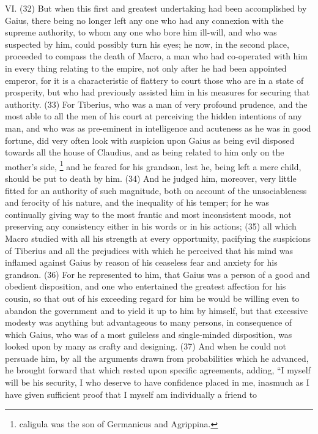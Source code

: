 VI. (32) But when this first and greatest undertaking had been accomplished by Gaius, there being
no longer left any one who had any connexion with the supreme authority, to whom any one who
bore him ill-will, and who was suspected by him, could possibly turn his eyes; he now, in the second
place, proceeded to compass the death of Macro, a man who had co-operated with him in every
thing relating to the empire, not only after he had been appointed emperor, for it is a characteristic
of flattery to court those who are in a state of prosperity, but who had previously assisted him in his
measures for securing that authority. (33) For Tiberius, who was a man of very profound
prudence, and the most able to all the men of his court at perceiving the hidden intentions of any
man, and who was as pre-eminent in intelligence and acuteness as he was in good fortune, did
very often look with suspicion upon Gaius as being evil disposed towards all the house of Claudius,
and as being related to him only on the mother's side, \footnote{caligula was the son of Germanicus and Agrippina.}
and he feared for his grandson, lest he, being left a mere child, should be put to death by him. (34)
And he judged him, moreover, very little fitted for an authority of such magnitude, both on account
of the unsociableness and ferocity of his nature, and the inequality of his temper; for he was
continually giving way to the most frantic and most inconsistent moods, not preserving any
consistency either in his words or in his actions; (35) all which Macro studied with all his strength at
every opportunity, pacifying the suspicions of Tiberius and all the prejudices with which he
perceived that his mind was inflamed against Gaius by reason of his ceaseless fear and anxiety
for his grandson. (36) For he represented to him, that Gaius was a person of a good and obedient
disposition, and one who entertained the greatest affection for his cousin, so that out of his
exceeding regard for him he would be willing even to abandon the government and to yield it up to
him by himself, but that excessive modesty was anything but advantageous to many persons, in
consequence of which Gaius, who was of a most guileless and single-minded disposition, was
looked upon by many as crafty and designing. (37) And when he could not persuade him, by all the
arguments drawn from probabilities which he advanced, he brought forward that which rested upon
specific agreements, adding, ``I myself will be his security, I who deserve to have confidence
placed in me, inasmuch as I have given sufficient proof that I myself am individually a friend to
